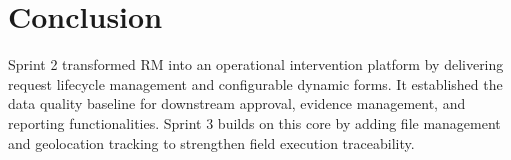
\section{Conclusion}

Sprint 2 transformed RM into an operational intervention platform by delivering request lifecycle management and configurable dynamic forms. It established the data quality baseline for downstream approval, evidence management, and reporting functionalities. Sprint 3 builds on this core by adding file management and geolocation tracking to strengthen field execution traceability.
